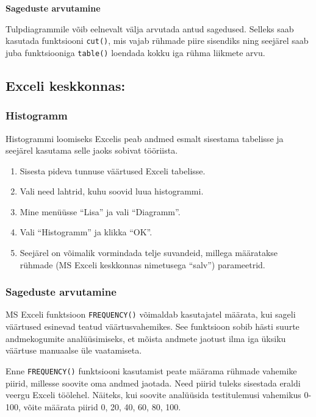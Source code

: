 \documentclass[
]{book}
\providecommand{\tightlist}{%
  \setlength{\itemsep}{0pt}\setlength{\parskip}{0pt}}
\begin{document}
\textbf{Sageduste arvutamine}

Tulpdiagrammile võib eelnevalt välja arvutada antud sagedused. Selleks saab kasutada funktsiooni \texttt{cut()}, mis vajab rühmade piire sisendiks ning seejärel saab juba funktsiooniga \texttt{table()} loendada kokku iga rühma liikmete arvu.

\subsection{Exceli keskkonnas:}\label{exceli-keskkonnas}

\subsubsection{Histogramm}\label{histogramm-1}

Histogrammi loomiseks Excelis peab andmed esmalt sisestama tabelisse ja seejärel kasutama selle jaoks sobivat tööriista.

\begin{enumerate}
\def\labelenumi{\arabic{enumi}.}
\tightlist
\item
  Sisesta pideva tunnuse väärtused Exceli tabelisse.
\item
  Vali need lahtrid, kuhu soovid luua histogrammi.
\item
  Mine menüüsse ``Lisa'' ja vali ``Diagramm''.
\item
  Vali ``Histogramm'' ja klikka ``OK''.
\item
  Seejärel on võimalik vormindada telje suvandeid, millega määratakse rühmade (MS Exceli keskkonnas nimetusega ``salv'') parameetrid.
\end{enumerate}

\subsubsection{Sageduste arvutamine}\label{sageduste-arvutamine}

MS Exceli funktsioon \texttt{FREQUENCY()} võimaldab kasutajatel määrata, kui sageli väärtused esinevad teatud väärtusvahemikes. See funktsioon sobib hästi suurte andmekogumite analüüsimiseks, et mõista andmete jaotust ilma iga üksiku väärtuse manuaalse üle vaatamiseta.

Enne \texttt{FREQUENCY()} funktsiooni kasutamist peate määrama rühmade vahemike piirid, millesse soovite oma andmed jaotada. Need piirid tuleks sisestada eraldi veergu Exceli töölehel. Näiteks, kui soovite analüüsida testitulemusi vahemikus 0-100, võite määrata piirid 0, 20, 40, 60, 80, 100.
\end{document}
